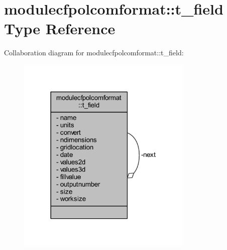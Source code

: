 \hypertarget{structmodulecfpolcomformat_1_1t__field}{}\section{modulecfpolcomformat\+:\+:t\+\_\+field Type Reference}
\label{structmodulecfpolcomformat_1_1t__field}


Collaboration diagram for modulecfpolcomformat\+:\+:t\+\_\+field\+:\nopagebreak
\begin{figure}[H]
\begin{center}
\leavevmode
\includegraphics[width=237pt]{structmodulecfpolcomformat_1_1t__field__coll__graph}
\end{center}
\end{figure}
